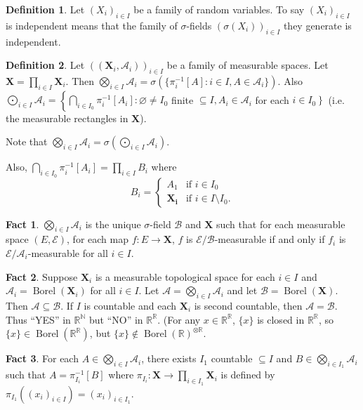 \documentclass{article}
\DeclareMathOperator{\Borel}{Borel}
\newcommand{\R}{\mathbb{R}}
\newcommand{\N}{\mathbb{N}}
\theoremstyle{definition}
\newtheorem*{definition}{Definition}
\newtheorem*{fact}{Fact}
\begin{document}
\begin{definition}
    Let $(X_i)_{i \in I}$ be a family of random variables. To say $(X_i)_{i \in I}$ is independent means that the family of $\sigma$-fields $(\sigma(X_i))_{i \in I}$ they generate is independent.
\end{definition}

\begin{definition}
    Let $((\mathbf{X}_i, \mathscr{A}_i))_{i \in I}$ be a family of measurable spaces. Let $\mathbf{X} = \prod_{i \in I} \mathbf{X}_i$. Then $\bigotimes_{i \in I} \mathscr{A}_i = \sigma(\{\pi_i^{-1}[A] : i \in I, A \in \mathscr{A}_i\})$. Also $\bigodot_{i \in I} \mathscr{A}_i = \left\{ \bigcap_{i \in I_0} \pi_i^{-1}[A_i] : \varnothing \neq I_0\right.$ finite $\subseteq I, A_i \in \mathscr{A}_i$ for each $\left. i \in I_0 \right\}$ (i.e. the measurable rectangles in $\mathbf{X}$).
    
    Note that $\bigotimes_{i \in I} \mathscr{A}_i = \sigma\left(\bigodot_{i \in I} \mathscr{A}_i\right)$.
    
    Also, $\bigcap_{i \in I_0} \pi_i^{-1}[A_i] = \prod_{i \in I} B_i$ where
    \[
        B_i = \begin{cases}
            A_1 &\text{if } i \in I_0 \\
            \mathbf{X_i} &\text{if } i \in I \setminus I_0.
        \end{cases}
    \]
\end{definition}

\begin{fact}
    $\bigotimes_{i \in I} \mathscr{A}_i$ is the unique $\sigma$-field $\mathscr{B}$ and $\mathbf{X}$ such that for each measurable space $(E, \mathscr{E})$, for each map $f : E \longrightarrow \mathbf{X}$, $f$ is $\mathscr{E}/\mathscr{B}$-measurable if and only if $f_i$ is $\mathscr{E}/\mathscr{A}_i$-measurable for all $i \in I$.
\end{fact}
\begin{fact}
Suppose $\mathbf{X}_i$ is a measurable topological space for each $i \in I$ and $\mathscr{A}_i = \Borel(\mathbf{X}_i)$ for all $i \in I$. Let $\mathscr{A} = \bigotimes_{i \in I} \mathscr{A}_i$ and let $\mathscr{B} = \Borel(\mathbf{X})$. Then $\mathscr{A} \subseteq \mathscr{B}$. If $I$ is countable and each $\mathbf{X}_i$ is second countable, then $\mathscr{A} = \mathscr{B}$. Thus ``YES'' in $\R^\N$ but ``NO'' in $\R^\R$. (For any $x \in \R^\R$, $\{x\}$ is closed in $\R^\R$, so $\{x\} \in \Borel(\R^\R)$, but $\{x\} \notin \Borel(\R)^{\otimes\R}$.
\end{fact}
\begin{fact}
For each $A \in \bigotimes_{i \in I} \mathscr{A}_i$, there exists $I_1$ countable $\subseteq I$ and $B \in \bigotimes_{i \in I_1} \mathscr{A}_i$ such that $A = \pi_{I_i}^{-1}[B]$ where $\pi_{I_i} : \mathbf{X} \longrightarrow \prod_{i \in I_1} \mathbf{X}_i$ is defined by $\pi_{I_1}((x_i)_{i \in I}) = (x_i)_{i \in I_1}$.
\end{fact}
\end{document}
